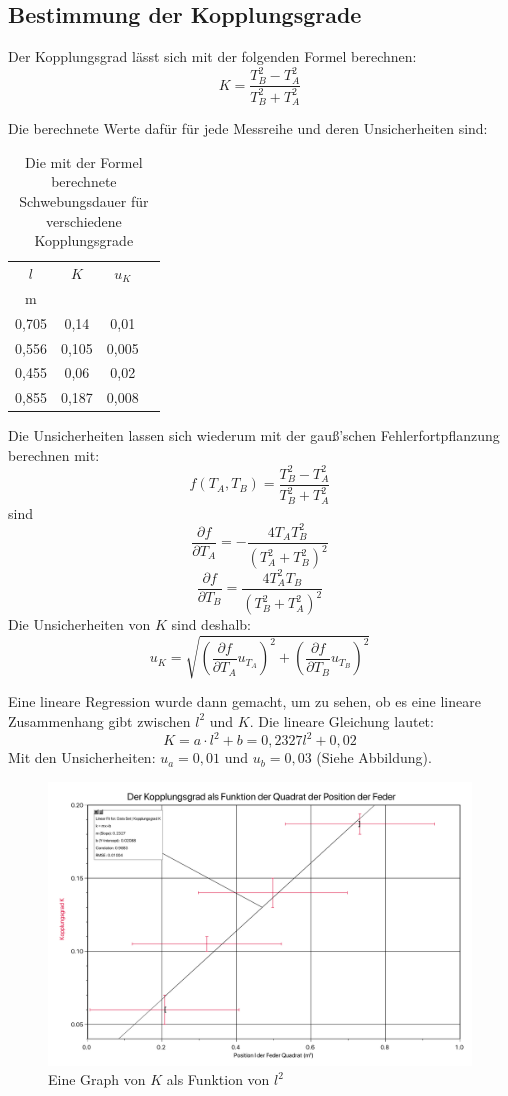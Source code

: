 \documentclass[11pt,a4paper]{article}
\begin{document}
\subsection{Bestimmung der Kopplungsgrade}
Der Kopplungsgrad lässt sich mit der folgenden Formel berechnen:
\begin{equation}
K = \frac{T_B^2-T_A^2}{T_B^2+T_A^2}
\end{equation}

Die berechnete Werte dafür für jede Messreihe und deren Unsicherheiten sind:

\begin{table}[h]
	\centering
	\begin{tabular*}{0.99\textwidth}{@{\extracolsep{\fill}}cccc}
		\toprule
		$l$ & $K$ & $u_{K}$  \\
		m &  &    \\
		\bottomrule
		0,705 & 0,14 & 0,01 \\
		0,556 & 0,105 & 0,005 \\
		0,455 & 0,06 & 0,02 \\
		0,855 & 0,187 & 0,008 \\
		\bottomrule
	\end{tabular*}
	\caption{Die mit der Formel berechnete Schwebungsdauer für verschiedene Kopplungsgrade}
	\label{tabelle}
\end{table}

Die Unsicherheiten lassen sich wiederum mit der gauß'schen Fehlerfortpflanzung berechnen mit:
$$f(T_A,T_B) = \frac{T_B^2-T_A^2}{T_B^2+T_A^2}$$
sind
$$\frac{\partial f}{\partial T_A} = -\frac{4T_A T_B^2}{(T_A^2+T_B^2)^2}$$
$$\frac{\partial f}{\partial T_B} = \frac{4T_A^2 T_B}{(T_B^2+T_A^2)^2}$$
Die Unsicherheiten von $K$ sind deshalb:
$$u_{K} = \sqrt{(\frac{\partial f}{\partial T_A}u_{T_A})^2+(\frac{\partial f}{\partial T_B}u_{T_B})^2}$$

Eine lineare Regression wurde dann gemacht, um zu sehen, ob es eine lineare Zusammenhang gibt zwischen $l^2$ und $K$. Die lineare Gleichung lautet:
$$ K = a\cdot l^2 +b = 0,2327 l^2 + 0,02 $$
Mit den Unsicherheiten: $u_a = 0,01$ und $u_b = 0,03$ (Siehe Abbildung). 
\begin{figure}[h]
	\centering
	\includegraphics[width=\textwidth]{Abb2}
	\caption{Eine Graph von $K$ als Funktion von $l^2$}
\end{figure}
\end{document}
